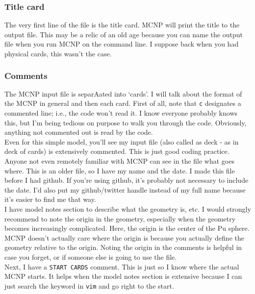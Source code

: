 \documentclass[11pt,a4paper]{article}
\begin{document}
\subsubsection{Title card}
\noindent The very first line of the file is the title card. MCNP will print the title to the output file. This may be a relic of an old age because you can name the output file when you run MCNP on the command line. I suppose back when you had physical cards, this wasn't the case. 

\subsubsection{Comments}
\noindent The MCNP input file is separAated into `cards'. I will talk about the format of the MCNP in general and then each card. First of all, note that \texttt{c} designates a commented line; i.e., the code won't read it. I know everyone probably knows this, but I'm being tedious on purpose to walk you through the code. Obviously, anything not commented out is read by the code.\\

\noindent Even for this simple model, you'll see my input file (also called as deck - as in deck of cards) is extensively commented. This is just good coding practice. Anyone not even remotely familiar with MCNP can see in the file what goes where. This is an older file, so I have my name and the date. I made this file before I had github. If you're using github, it's probably not necessary to include the date. I'd also put my github/twitter handle instead of my full name because it's easier
to find me that way.\\

\noindent I have model notes section to describe what the geometry is, etc. I would strongly recommend to note the origin in the geometry, especially when the geometry becomes increasingly complicated. Here, the origin is the center of the Pu sphere. MCNP doesn't actually care where the origin is because you actually define the geometry relative to the origin. Noting the origin in the comments is helpful in case you forget, or if someone else is going to use the file. \\

\noindent Next, I have a \texttt{START CARDS} comment. This is just so I know where the actual MCNP starts. It helps when the model notes section is extensive because I can just search the keyword in \texttt{vim} and go right to the start. \\
\end{document}
